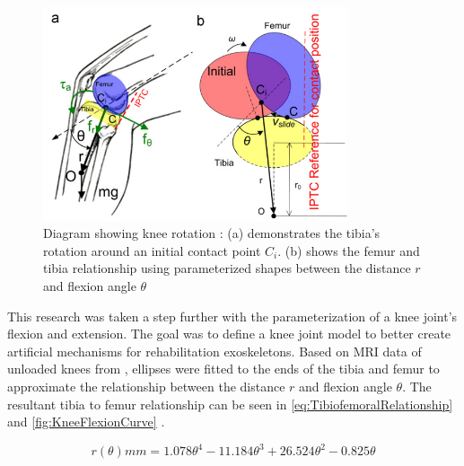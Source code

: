 \begin{figure}[ht!]
    \centering
    \includegraphics[width=0.8\textwidth]{Figures/Background/KneeParameterization.png}
    \caption{Diagram showing knee rotation \cite{KinDynKneeJoint}: (a) demonstrates the tibia's rotation around an initial contact point \(C_i\). (b) shows the femur and tibia relationship using parameterized shapes between the distance \(r\) and flexion angle \(\theta\)}
    \label{fig:KneeParameterization}
\end{figure}

This research was taken a step further with the parameterization of a knee joint's flexion and extension. The goal was to define a knee joint model to better create artificial mechanisms for rehabilitation exoskeletons. Based on MRI data of unloaded knees from \cite{MRIKneeShape_Unloaded}, ellipses were fitted to the ends of the tibia and femur to approximate the relationship between the distance \(r\) and flexion angle \(\theta\). The resultant tibia to femur relationship can be seen in \autoref{eq:TibiofemoralRelationship} and \autoref{fig:KneeFlexionCurve} \cite{KinDynKneeJoint}.

\begin{equation}
    r(\theta) mm = 1.078\theta^4 - 11.184\theta^3 + 26.524\theta^2 - 0.825\theta
    \label{eq:TibiofemoralRelationship}
\end{equation}

